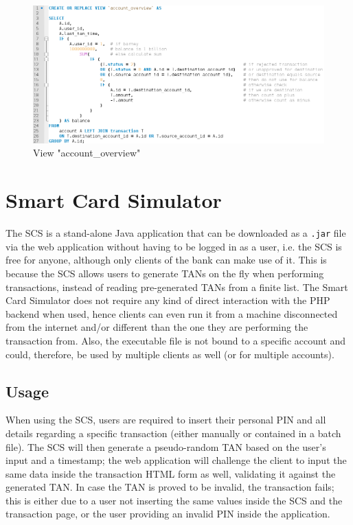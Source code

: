 \begin{description}
\begin{figure}[h!tbp]
	\centering
	\includegraphics[width=\textwidth]{figures/code_account_overview}
	\caption{View "account\_overview"}
	\label{figure:accountoverviewfigure}
\end{figure}

\end{description}

\section{Smart Card Simulator}\label{section:scs}
The SCS is a stand-alone Java application that can be downloaded as a \texttt{.jar} file via the web application without having to be logged in as a user, i.e. the SCS is free for anyone, although only clients of the bank can make use of it. This is because the SCS allows users to generate TANs on the fly when performing transactions, instead of reading pre-generated TANs from a finite list. \newline
The \gnb{} Smart Card Simulator does not require any kind of direct interaction with the PHP backend when used, hence clients can even run it from a machine disconnected from the internet and/or different than the one they are performing the transaction from. Also, the executable file is not bound to a specific account and could, therefore, be used by multiple clients as well (or for multiple accounts).
\subsection{Usage}
When using the SCS, users are required to insert their personal PIN and all details regarding a specific transaction (either manually or contained in a batch file). The SCS will then generate a pseudo-random TAN based on the user's input and a timestamp; the web application will challenge the client to input the same data inside the transaction HTML form as well, validating it against the generated TAN. In case the TAN is proved to be invalid, the transaction fails; this is either due to a user not inserting the same values inside the SCS and the transaction page, or the user providing an invalid PIN inside the application.\newline

